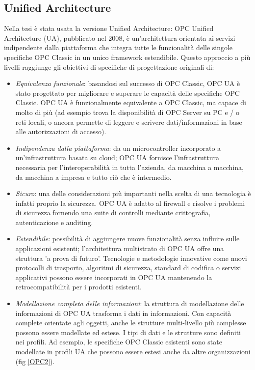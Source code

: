 \documentclass[12pt, a4paper, oneside]{book}
\begin{document}
\subsection{Unified Architecture}
Nella tesi è stata usata la versione Unified Architecture: OPC Unified Architecture (UA), pubblicato nel 2008, è un'architettura orientata ai servizi indipendente dalla piattaforma che integra tutte le funzionalità delle singole specifiche OPC Classic in un unico framework estendibile. Questo approccio a più livelli raggiunge gli obiettivi di specifiche di progettazione originali di:
\begin{itemize}
	\item \textit{Equivalenza funzionale}: basandosi sul successo di OPC Classic, OPC UA è stato progettato per migliorare e superare le capacità delle specifiche OPC Classic. OPC UA è funzionalmente equivalente a OPC Classic, ma capace di molto di più (ad esempio trova la disponibilità di OPC Server su PC e / o reti locali, o ancora permette di leggere e scrivere dati/informazioni in base alle autorizzazioni di accesso).
	\item \textit{Indipendenza dalla piattaforma}: da un microcontroller incorporato a un'infrastruttura basata su cloud; OPC UA fornisce l'infrastruttura necessaria per l'interoperabilità in tutta l'azienda, da macchina a macchina, da macchina a impresa e tutto ciò che è intermedio.
	\item \textit{Sicuro}: una delle considerazioni più importanti nella scelta di una tecnologia è infatti proprio la sicurezza. OPC UA è adatto al firewall e risolve i problemi di sicurezza fornendo una suite di controlli mediante crittografia, autenticazione e auditing.
	\item \textit{Estendibile}: possibilità di aggiungere nuove funzionalità senza influire sulle applicazioni esistenti; l'architettura multistrato di OPC UA offre una struttura 'a prova di futuro'. Tecnologie e metodologie innovative come nuovi protocolli di trasporto, algoritmi di sicurezza, standard di codifica o servizi applicativi possono essere incorporati in OPC UA mantenendo la retrocompatibilità per i prodotti esistenti.
	\item \textit{Modellazione completa delle informazioni}: la struttura di modellazione delle informazioni di OPC UA trasforma i dati in informazioni. Con capacità complete orientate agli oggetti, anche le strutture multi-livello più complesse possono essere modellate ed estese. I tipi di dati e le strutture sono definiti nei profili. Ad esempio, le specifiche OPC Classic esistenti sono state modellate in profili UA che possono essere estesi anche da altre organizzazioni (fig \ref{OPC2}).

\end{itemize}
\end{document}
